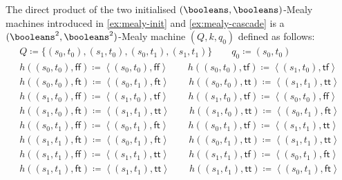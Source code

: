 \begin{example}\label{ex:mealy-direct}
    The direct product of the two initialised \((\booleans,\booleans)\)-Mealy
    machines introduced in \cref{ex:mealy-init} and \cref{ex:mealy-cascade} is
    a \((\booleans^2,\booleans^2)\)-Mealy machine \((Q,k,q_0)\) defined as
    follows:
    \begin{gather*}
        Q \coloneqq \{(s_0,t_0), (s_1,t_0), (s_0,t_1), (s_1,t_1)\}
        \qquad
        q_0 \coloneqq (s_0,t_0)
        \\
        h((s_0, t_0), \mathsf{ff})
        \coloneqq
        \left\langle(s_0, t_0), \mathsf{ff}\right\rangle
        \qquad
        h((s_0, t_0), \mathsf{tf})
        \coloneqq
        \left\langle(s_1, t_0), \mathsf{tf}\right\rangle
        \\
        h((s_0, t_0), \mathsf{ft})
        \coloneqq
        \left\langle(s_0, t_1), \mathsf{ft}\right\rangle
        \qquad
        h((s_0, t_0), \mathsf{tt})
        \coloneqq
        \left\langle(s_1, t_1), \mathsf{tt}\right\rangle
        \\
        h((s_1, t_0), \mathsf{ff})
        \coloneqq
        \left\langle(s_1, t_0), \mathsf{tf}\right\rangle
        \qquad
        h((s_1, t_0), \mathsf{tf})
        \coloneqq
        \left\langle(s_0, t_0), \mathsf{ff}\right\rangle
        \\
        h((s_1, t_0), \mathsf{ft})
        \coloneqq
        \left\langle(s_1, t_1), \mathsf{tt}\right\rangle
        \qquad
        h((s_1, t_0), \mathsf{tt})
        \coloneqq
        \left\langle(s_0, t_1), \mathsf{ft}\right\rangle
        \\
        h((s_0, t_1), \mathsf{ff})
        \coloneqq
        \left\langle(s_0, t_1), \mathsf{ft}\right\rangle
        \qquad
        h((s_0, t_1), \mathsf{tf})
        \coloneqq
        \left\langle(s_1, t_1), \mathsf{tt}\right\rangle
        \\
        h((s_1, t_1), \mathsf{ft})
        \coloneqq
        \left\langle(s_0, t_1), \mathsf{ft}\right\rangle
        \qquad
        h((s_0, t_1), \mathsf{tt})
        \coloneqq
        \left\langle(s_1, t_1), \mathsf{tt}\right\rangle
        \\
        h((s_1, t_1), \mathsf{ff})
        \coloneqq
        \left\langle(s_1, t_1), \mathsf{tt}\right\rangle
        \qquad
        h((s_1, t_1), \mathsf{tf})
        \coloneqq
        \left\langle(s_0, t_1), \mathsf{ft}\right\rangle
        \\
        h((s_1, t_1), \mathsf{ft})
        \coloneqq
        \left\langle(s_1, t_1), \mathsf{tt}\right\rangle
        \qquad
        h((s_1, t_1), \mathsf{tt})
        \coloneqq
        \left\langle(s_0, t_1), \mathsf{ft}\right\rangle
    \end{gather*}
    \begin{center}
        
    \end{center}
\end{example}

